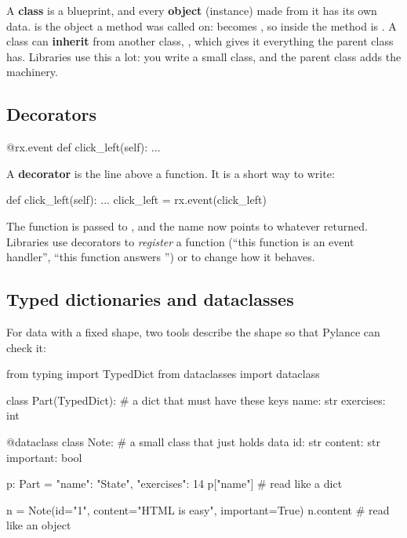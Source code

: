 A \textbf{class} is a blueprint, and every \textbf{object} (instance) made from it has its own data.  is the object a method was called on:  becomes , so inside the method  is . A class can \textbf{inherit} from another class, , which gives it everything the parent class has. Libraries use this a lot: you write a small class, and the parent class adds the machinery.

\subsection{Decorators}

\begin{py}
@rx.event
def click_left(self):
	...
\end{py}

A \textbf{decorator} is the  line above a function. It is a short way to write:

\begin{py}
def click_left(self):
	...
click_left = rx.event(click_left)
\end{py}

The function is passed to , and the name now points to whatever  returned. Libraries use decorators to \emph{register} a function (``this function is an event handler'', ``this function answers '') or to change how it behaves.

\subsection{Typed dictionaries and dataclasses}

For data with a fixed shape, two tools describe the shape so that Pylance can check it:

\begin{py}
from typing import TypedDict
from dataclasses import dataclass


class Part(TypedDict):          # a dict that must have these keys
	name: str
	exercises: int


@dataclass
class Note:                      # a small class that just holds data
	id: str
	content: str
	important: bool


p: Part = {"name": "State", "exercises": 14}
p["name"]                        # read like a dict

n = Note(id="1", content="HTML is easy", important=True)
n.content                        # read like an object
\end{py}

